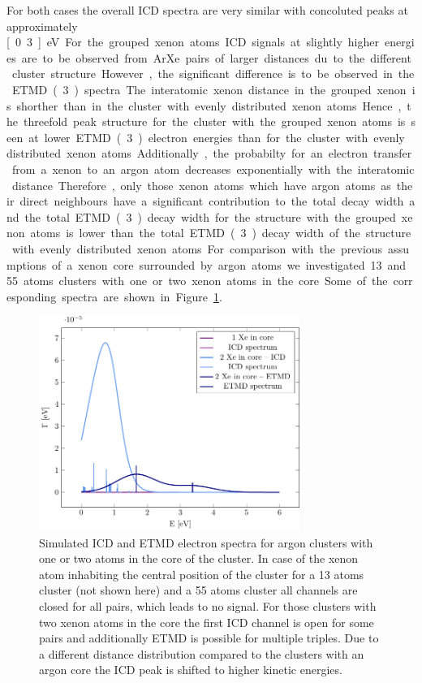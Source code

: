 For both cases the overall ICD spectra are very similar with concoluted
peaks at approximately \unit[0.3]{eV}. For the grouped xenon atoms ICD
signals at slightly higher energies are to be observed from ArXe pairs of
larger distances du to the different cluster structure. However, the
significant difference is to be observed in the ETMD(3) spectra. The
interatomic xenon distance in the grouped xenon is shorther than in the
cluster with evenly distributed xenon atoms. Hence, the threefold
peak structure for the cluster with the grouped xenon atoms is seen at
lower ETMD(3) electron energies than for the cluster with evenly
distributed xenon atoms. Additionally, the probabilty for an electron
transfer from a xenon to an argon atom decreases exponentially with the
interatomic distance. Therefore, only those xenon atoms which have argon
atoms as their direct neighbours have a significant contribution to the
total decay width and the total ETMD(3) decay width for the structure with
the grouped xenon atoms is lower than the total ETMD(3) decay width of
the structure with evenly distributed xenon atoms.


For comparison with the previous assumptions of a xenon core surrounded
by argon atoms we investigated 13 and 55 atoms clusters with one or two
xenon atoms in the core. Some of the corresponding
spectra are shown in Figure \ref{figure:xe_3_in}.

\begin{figure}[h]
 \centering
 \includegraphics[width=8.5cm]{pics/xe_3_in.pdf}
 \caption{Simulated ICD and ETMD electron spectra for argon clusters with
          one or two atoms in the core of the cluster. In case of the xenon
          atom inhabiting the central position of the cluster for a 13 atoms
          cluster (not shown here) and a 55 atoms cluster all channels are closed
          for all pairs, which leads to no signal. For those clusters with two
          xenon atoms in the core the first ICD channel is open for some pairs
          and additionally ETMD is possible for multiple triples. Due to a
          different distance distribution compared to the clusters with an argon
          core the ICD peak is shifted to higher kinetic energies.}
 \label{figure:xe_3_in}
\end{figure}

